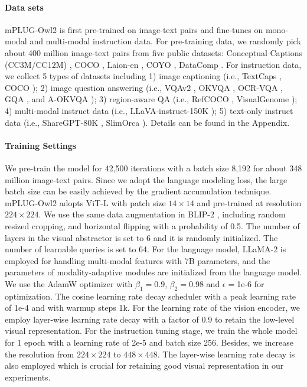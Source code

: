 \documentclass[10pt,twocolumn,letterpaper]{article}
\newcommand{\modelname}{mPLUG-Owl2\xspace}
\begin{document}
\paragraph{Data sets} 
\modelname is first pre-trained on image-text pairs and fine-tunes on mono-modal and multi-modal instruction data. For pre-training data, we randomly pick about 400 million image-text pairs from five public datasets: Conceptual Captions (CC3M/CC12M) \cite{changpinyo2021cc3m12m}, COCO \cite{lin2014coco}, Laion-en \cite{schuhmann2022laion}, COYO \cite{kakaobrain2022coyo-700m}, DataComp \cite{gadre2023datacomp}. For instruction data, we collect 5 types of datasets including 1) image captioning (i.e., TextCaps \cite{sidorov2020textcaps}, COCO \cite{lin2014coco}); 2) image question answering (i.e., VQAv2 \cite{balanced_vqa_v2}, OKVQA \cite{marino2019okvqa}, OCR-VQA \cite{mishra2019ocrvqa}, GQA \cite{hudson2019gqa}, and A-OKVQA \cite{schwenk2022aokvqa}); 3) region-aware QA (i.e., RefCOCO \cite{yu2016refcoco}, VisualGenome \cite{krishna2017visualgenome}); 4) multi-modal instruct data (i.e., LLaVA-instruct-150K \cite{Liu2023Llava}); 5) text-only instruct data (i.e., ShareGPT-80K \cite{ShareGPT2023}, SlimOrca \cite{SlimOrca}). Details can be found in the Appendix.

\paragraph{Training Settings}
We pre-train the model for 42,500 iterations with a batch size 8,192 for about 348 million image-text pairs. Since we adopt the language modeling loss, the large batch size can be easily achieved by the gradient accumulation technique. \modelname adopts ViT-L \cite{radford2021clip} with patch size $14\times 14$ and pre-trained at resolution $224 \times 224$. We use the same data augmentation in BLIP-2 \cite{Li2023BLIP2}, including random resized cropping, and horizontal flipping with a probability of 0.5. The number of layers in the visual abstractor is set to 6 and it is randomly initialized. The number of learnable queries is set to 64. For the language model, LLaMA-2 \cite{Touvron2023Llama2} is employed for handling multi-modal features with 7B parameters, and the parameters of modality-adaptive modules are initialized from the language model. We use the AdamW \cite{loshchilov2018adamW} optimizer with $\beta_1 = 0.9$, $\beta_2 = 0.98$ and $\epsilon=$1e-6 for optimization. The cosine learning rate decay scheduler with a peak learning rate of 1e-4 and with warmup steps 1k. For the learning rate of the vision encoder, we employ layer-wise learning rate decay with a factor of 0.9 to retain the low-level visual representation. For the instruction tuning stage, we train the whole model for 1 epoch with a learning rate of 2e-5 and batch size 256. Besides, we increase the resolution from $224 \times 224$ to $448 \times 448$. The layer-wise learning rate decay is also employed which is crucial for retaining good visual representation in our experiments.
\end{document}
